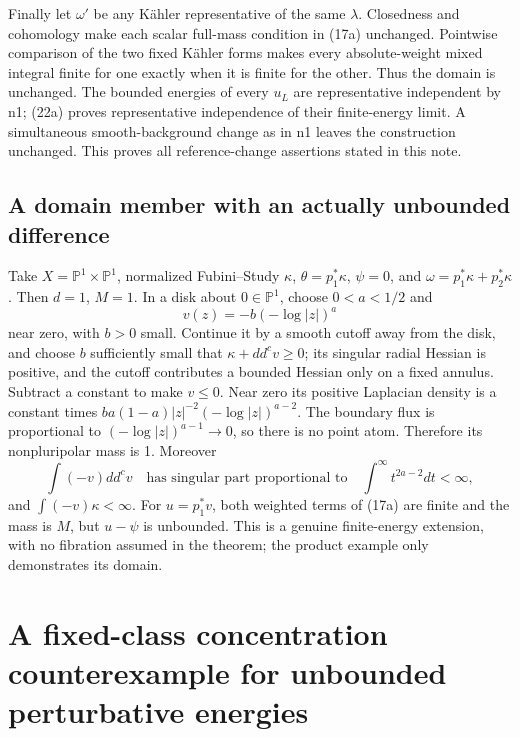 \documentclass[
  11pt,
]{article}
\begin{document}
Finally let \(\omega'\) be any Kähler representative of the same
\(\lambda\). Closedness and cohomology make each scalar full-mass
condition in (17a) unchanged. Pointwise comparison of the two fixed
Kähler forms makes every absolute-weight mixed integral finite for one
exactly when it is finite for the other. Thus the domain is unchanged.
The bounded energies of every \(u_L\) are representative independent by
n1; (22a) proves representative independence of their finite-energy
limit. A simultaneous smooth-background change as in n1 leaves the
construction unchanged. This proves all reference-change assertions
stated in this note.

\subsection{A domain member with an actually unbounded
difference}\label{a-domain-member-with-an-actually-unbounded-difference}

Take \(X=\mathbb{P}^1\times\mathbb{P}^1\), normalized Fubini--Study
\(\kappa\), \(\theta=p_1^*\kappa\), \(\psi=0\), and
\(\omega=p_1^*\kappa+p_2^*\kappa\). Then \(d=1\), \(M=1\). In a disk
about \(0\in\mathbb{P}^1\), choose \(0<a<1/2\) and \[
v(z)=-b(-\log|z|)^a
\] near zero, with \(b>0\) small. Continue it by a smooth cutoff away
from the disk, and choose \(b\) sufficiently small that
\(\kappa+dd^cv\geq0\); its singular radial Hessian is positive, and the
cutoff contributes a bounded Hessian only on a fixed annulus. Subtract a
constant to make \(v\leq0\). Near zero its positive Laplacian density is
a constant times \(b a(1-a)|z|^{-2}(-\log|z|)^{a-2}\). The boundary flux
is proportional to \((-\log|z|)^{a-1}\to0\), so there is no point atom.
Therefore its nonpluripolar mass is 1. Moreover \[
\int(-v)dd^cv\quad\text{has singular part proportional to}
\quad\int^{\infty}t^{2a-2}dt<\infty,
\] and \(\int(-v)\kappa<\infty\). For \(u=p_1^*v\), both weighted terms
of (17a) are finite and the mass is \(M\), but \(u-\psi\) is unbounded.
This is a genuine finite-energy extension, with no fibration assumed in
the theorem; the product example only demonstrates its domain.

\section{A fixed-class concentration counterexample for unbounded
perturbative
energies}\label{a-fixed-class-concentration-counterexample-for-unbounded-perturbative-energies}
\end{document}
